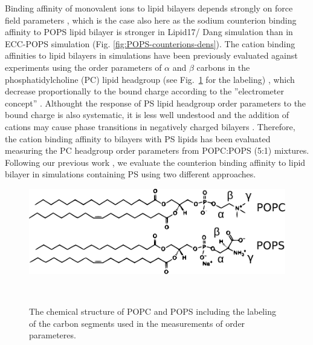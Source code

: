 \documentclass[journal=jpcbfk,manuscript=article]{achemso}
\newlength{\figwidth}
\begin{document}
Binding affinity of monovalent ions to lipid bilayers depends strongly on
force field parameters \cite{catte16,NMRlipidsIV},
which is the case also here as the sodium counterion binding affinity to
POPS lipid bilayer is stronger in Lipid17/ Dang simulation than in
ECC-POPS simulation (Fig. \ref{fig:POPS-counterions-dens}).
The cation binding affinities to lipid bilayers in simulations have been previously evaluated
against experiments using the order parameters of $\alpha$ and $\beta$ carbons in the
phosphatidylcholine (PC) lipid headgroup (see Fig.~\ref{fig:chemstruct_pc_ps} for the labeling) \cite{catte16,melcr18,NMRlipidsIV},
which decrease proportionally to the bound charge according to the ''electrometer concept'' \citep{seelig87}.
Althought the response of PS lipid headgroup order parameters to the bound charge is also systematic,
it is less well undestood and the addition of cations may cause phase transitions in negatively charged
bilayers \cite{feigenson86,mattai89,roux91,roux90}. Therefore, the cation binding affinity to bilayers with
PS lipids has been evaluated measuring the PC headgroup order parameters from POPC:POPS (5:1)
mixtures\cite{roux90,NMRlipidsIV}.
Following our previous work \cite{NMRlipidsIV}, we evaluate the counterion binding affinity
to lipid bilayer in simulations containing PS using two different approaches.



\begin{figure}[tb!] 
  \centering 
  \includegraphics[width=\figwidth]{../Fig/lipids_chemfig_POPC_POPS.pdf} 
  \caption{ \label{fig:chemstruct_pc_ps} 
            The chemical structure of POPC and POPS 
            including the labeling of the carbon segments
            used in the measurements of order parameteres. 
          }
           \\
\end{figure} 
\end{document}
